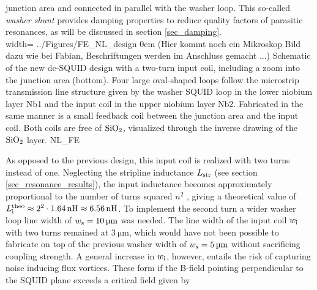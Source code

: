 junction area and connected in parallel with the washer loop. This so-called \textit{washer shunt} provides damping properties to reduce quality factors of parasitic resonances, as will be discussed in section \ref{sec_damping}. \\

{width=\textwidth}
{../Figures/FE_NL_design}
{0cm}
{(Hier kommt noch ein Mikroskop Bild dazu wie bei Fabian, Beschriftungen werden im Anschluss gemacht ...) Schematic of the new dc-SQUID design with a two-turn input coil, including a zoom into the junction area (bottom). Four large oval-shaped loops follow the microstrip transmission line structure given by the washer SQUID loop in the lower niobium layer Nb1 and the input coil in the upper niobium layer Nb2. Fabricated in the same manner is a small feedback coil between the junction area and the input coil. Both coils are free of $\rm{SiO_2}$, visualized through the inverse drawing of the $\rm{SiO_2}$ layer.} 
{NL_FE}

As opposed to the previous design, this input coil is realized with two turns instead of one. Neglecting the stripline inductance $L_{\rm str}$ (see section \ref{sec_resonance_results}), the input inductance becomes approximately proportional to the number of turns squared $n^2$ \cite{Ketchen1981,Jaycox1981}, giving a theoretical value of $L_{\rm i}^{\rm theo}\approx2^{2}\cdot \qty{1.64}{\nano\henry}\approx\qty{6.56}{\nano\henry}$. To implement the second turn a wider washer loop line width of $w_{\rm s}=\qty{10}{\micro\meter}$ was needed. The line width of the input coil $w_{\rm i}$ with two turns remained at $\qty{3}{\micro\meter}$, which would have not been possible to fabricate on top of the previous washer width of $w_{\rm s}=\qty{5}{\micro\meter}$ without sacrificing coupling strength. A general increase in $w_{\rm i}$, however, entails the risk of capturing noise inducing flux vortices. These form if the B-field pointing perpendicular to the SQUID plane exceeds a critical field given by \cite{Kuit2008} 


